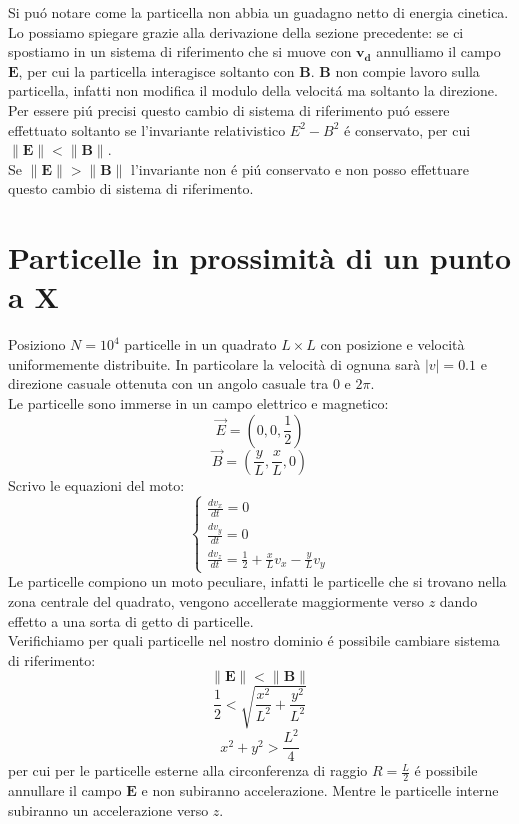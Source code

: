 \documentclass[11pt]{article}
\begin{document}
Si puó notare come la particella non abbia un guadagno netto di energia cinetica. Lo possiamo spiegare grazie alla derivazione della sezione precedente: se ci spostiamo in un sistema di riferimento che si muove con $\mathbf{v_d}$ annulliamo il campo $\mathbf{E}$, per cui la particella interagisce soltanto con $\mathbf{B}$. $\mathbf{B}$ non compie lavoro sulla particella, infatti non modifica il modulo della velocitá ma soltanto la direzione. \\
Per essere piú precisi questo cambio di sistema di riferimento puó essere effettuato soltanto se l'invariante relativistico $E^2 - B^2 $ é conservato, per cui $ \|\mathbf{E}\| < \|\mathbf{B}\|$. \\
Se $ \|\mathbf{E}\| > \|\mathbf{B}\|$ l'invariante non é piú conservato e non posso effettuare questo cambio di sistema di riferimento.


\section{Particelle in prossimit\`a di un punto a X}
Posiziono $N = 10^4 $ particelle in un quadrato $L \times L$ con posizione e velocit\`a uniformemente distribuite. In particolare la velocit\`a di ognuna sar\`a $|v|=0.1$ e direzione casuale ottenuta con un angolo casuale tra $0$ e $2\pi$.\\
Le particelle sono immerse in un campo elettrico e magnetico:
\begin{equation}\vec{E}=\left(0,0,\frac{1}{2} \right)\end{equation}
\begin{equation}\vec{B}=\left(\frac{y}{L},\frac{x}{L},0\right) \end{equation} 
Scrivo le equazioni del moto:
\begin{equation}
\begin{cases} 
\frac{dv_x}{dt}= 0 \\ 
\frac{dv_y}{dt}= 0 \\ 
\frac{dv_z}{dt}= \frac{1}{2} + \frac{x}{L}v_x - \frac{y}{L}v_y 
\end{cases}
\end{equation}
Le particelle compiono un moto peculiare, infatti le particelle che si trovano nella zona centrale del quadrato, vengono accellerate maggiormente verso $z$ dando effetto a una sorta di getto di particelle.\\
Verifichiamo per quali particelle nel nostro dominio é possibile cambiare sistema di riferimento:
\begin{equation} \|\mathbf{E}\| < \|\mathbf{B}\|\end{equation}
\begin{equation}\frac{1}{2} < \sqrt{\frac{x^2}{L^2} + \frac{y^2}{L^2}} \end{equation}
\begin{equation} x^2 + y^2 > \frac{L^2}{4}\end{equation}
per cui per le particelle esterne alla circonferenza di raggio $R = \frac{L}{2}$ é possibile annullare il campo $\mathbf{E}$ e non subiranno accelerazione. Mentre le particelle interne subiranno un accelerazione verso $z$.
\end{document}
